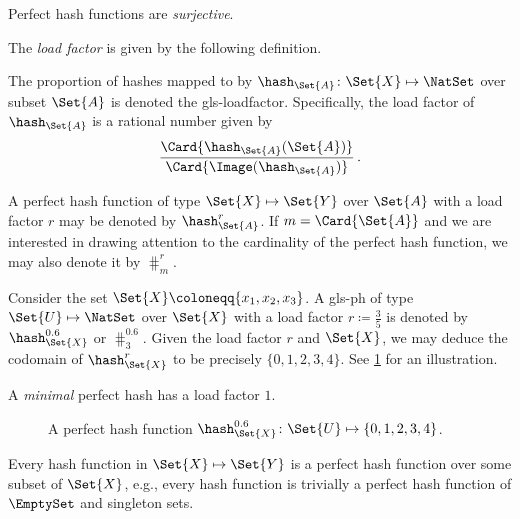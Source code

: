 \documentclass[ ../main.tex]{subfiles}
\begin{document}
\begin{assumption}
Perfect hash functions are \emph{surjective}.
\end{assumption}

The \emph{load factor} is given by the following definition.
\begin{definition}
\label{def:loadfactor}
The proportion of hashes mapped to by $\hash_{\Set{A}} \colon \Set{X} \mapsto \NatSet$ over subset $\Set{A}$ is denoted the \gls{gls-loadfactor}.
Specifically, the load factor of $\hash_{\Set{A}}$ is a rational number given by
\begin{equation}
\label{eq:loadfactor}
    \frac{\Card{\hash_{\Set{A}}(\Set{A})}}{\Card{\Image(\hash_{\Set{A}})}}\,.
\end{equation}
\end{definition}


\begin{notation}
A perfect hash function of type $\Set{X} \mapsto \Set{Y}$ over $\Set{A}$ with a load factor $r$ may be denoted by $\hash_{\Set{A}}^{r}$.
If $m = \Card{\Set{A}}$ and we are interested in drawing attention to the cardinality of the perfect hash function, we may also denote it by $\hash_{m}^{r}$.
\end{notation}





\begin{example}
Consider the set $\Set{X} \coloneqq \{x_1,x_2,x_3\}$.
A \gls{gls-ph} of type $\Set{U} \mapsto \NatSet$ over $\Set{X}$ with a load factor $r \coloneqq \frac{3}{5}$ is denoted by $\hash_{\Set{X}}^{0.6}$ or $\hash_{3}^{0.6}$.
Given the load factor $r$ and $\Set{X}$, we may deduce the codomain of $\hash_{\Set{X}}^{r}$ to be precisely $\{0,1,2,3,4\}$.
See \cref{fig:perfhash} for an illustration.
\end{example}

\begin{definition}
A \emph{minimal} perfect hash has a load factor $1$.
\end{definition}

\begin{figure}
\caption{A perfect hash function $\hash_{\Set{X}}^{0.6} \colon \Set{U} \mapsto \{0,1,2,3,4\}$.}
\label{fig:perfhash}
\center

\end{figure}

Every hash function in $\Set{X} \mapsto \Set{Y}$ is a perfect hash function over some subset of $\Set{X}$, e.g., every hash function is trivially a perfect hash function of $\EmptySet$ and singleton sets.
\end{document}
